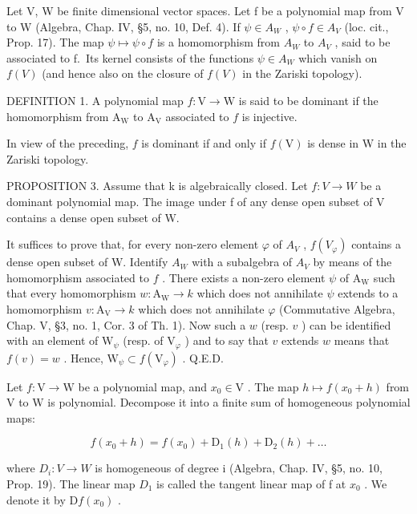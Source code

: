 
Let V, W be finite dimensional vector spaces. Let f be a polynomial map from V to W (Algebra, Chap. IV, §5, no. 10, Def. 4). If \(\psi \in A_{W}\) , \(\psi \circ f \in A_{V}\) (loc. cit., Prop. 17). The map \(\psi \mapsto \psi \circ f\) is a homomorphism from \(A_{W}\) to \(A_{V}\) , said to be associated to f.~Its kernel consists of the functions \(\psi \in A_{W}\) which vanish on \(f(V)\) (and hence also on the closure of \(f(V)\) in the Zariski topology).

DEFINITION 1. A polynomial map \(f: \mathrm{V} \to \mathrm{W}\) is said to be dominant if the homomorphism from \(\mathrm{A_W}\) to \(\mathrm{A_V}\) associated to \(f\) is injective.

In view of the preceding, \(f\) is dominant if and only if \(f(\mathrm{V})\) is dense in W in the Zariski topology.

PROPOSITION 3. Assume that k is algebraically closed. Let \(f : V \to W\) be a dominant polynomial map. The image under f of any dense open subset of V contains a dense open subset of W.

It suffices to prove that, for every non-zero element \(\varphi\) of \(A_{V}\) , \(f(V_{\varphi})\) contains a dense open subset of W. Identify \(A_{W}\) with a subalgebra of \(A_{V}\) by means of the homomorphism associated to \(f\) . There exists a non-zero element \(\psi\) of \(\mathrm{A_W}\) such that every homomorphism \(w: \mathrm{A_W} \to k\) which does not annihilate \(\psi\) extends to a homomorphism \(v: \mathrm{A_V} \to k\) which does not annihilate \(\varphi\) (Commutative Algebra, Chap. V, §3, no. 1, Cor. 3 of Th. 1). Now such a \(w\) (resp. \(v\) ) can be identified with an element of \(\mathrm{W}_{\psi}\) (resp. of \(\mathrm{V}_{\varphi}\) ) and to say that \(v\) extends \(w\) means that \(f(v) = w\) . Hence, \(\mathrm{W}_{\psi} \subset f(\mathrm{V}_{\varphi})\) . Q.E.D.

Let \(f: \mathrm{V} \to \mathrm{W}\) be a polynomial map, and \(x_0 \in \mathrm{V}\) . The map \(h \mapsto f(x_0 + h)\) from \(\mathrm{V}\) to \(\mathrm{W}\) is polynomial. Decompose it into a finite sum of homogeneous polynomial maps:

\[
f (x _ {0} + h) = f (x _ {0}) + \mathrm{D} _ {1} (h) + \mathrm{D} _ {2} (h) + \dots
\]

where \(D_{i}: V \to W\) is homogeneous of degree i (Algebra, Chap. IV, §5, no. 10, Prop. 19). The linear map \(D_{1}\) is called the tangent linear map of f at \(x_{0}\) . We denote it by \(\mathrm{D}f(x_{0})\) .

